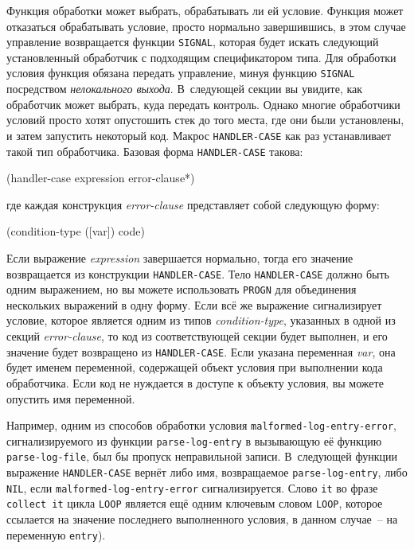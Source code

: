 Функция обработки может выбрать, обрабатывать ли ей условие. Функция может отказаться
обрабатывать условие, просто нормально завершившись, в этом случае управление возвращается
функции \lstinline{SIGNAL}, которая будет искать следующий установленный обработчик с
подходящим спецификатором типа. Для обработки условия функция обязана передать управление,
минуя функцию \lstinline{SIGNAL} посредством \textit{нелокального выхода}. В~следующей секции
вы увидите, как обработчик может выбрать, куда передать контроль. Однако многие
обработчики условий просто хотят опустошить стек до того места, где они были установлены,
и затем запустить некоторый код. Макрос \lstinline{HANDLER-CASE} как раз устанавливает такой
тип обработчика. Базовая форма \lstinline{HANDLER-CASE} такова:

\begin{myverb}
(handler-case expression
  error-clause*)
\end{myverb}

\noindent{}где каждая конструкция \textit{error-clause} представляет собой следующую форму:

\begin{myverb}
(condition-type ([var]) code)
\end{myverb}

Если выражение \textit{expression} завершается нормально, тогда его значение возвращается
из конструкции \lstinline{HANDLER-CASE}. Тело \lstinline{HANDLER-CASE} должно быть одним выражением,
но вы можете использовать \lstinline{PROGN} для объединения нескольких выражений в одну
форму. Если всё же выражение сигнализирует условие, которое является одним из типов
\textit{condition-type}, указанных в одной из секций \textit{error-clause}, то код из
соответствующей секции будет выполнен, и его значение будет возвращено из
\lstinline{HANDLER-CASE}. Если указана переменная \textit{var}, она будет именем переменной,
содержащей объект условия при выполнении кода обработчика. Если код не нуждается в доступе
к объекту условия, вы можете опустить имя переменной.

Например, одним из способов обработки условия \lstinline{malformed-log-entry-error},
сигнализируемого из функции \lstinline{parse-log-entry} в вызывающую её функцию
\lstinline{parse-log-file}, был бы пропуск неправильной записи. В~следующей функции выражение
\lstinline{HANDLER-CASE} вернёт либо имя, возвращаемое \lstinline{parse-log-entry}, либо \lstinline{NIL},
если \lstinline{malformed-log-entry-error} сигнализируется. Слово \lstinline{it} во фразе
\lstinline{collect it} цикла \lstinline{LOOP} является ещё одним ключевым словом \lstinline{LOOP},
которое ссылается на значение последнего выполненного условия, в данном случае~-- на
переменную \lstinline{entry}).

